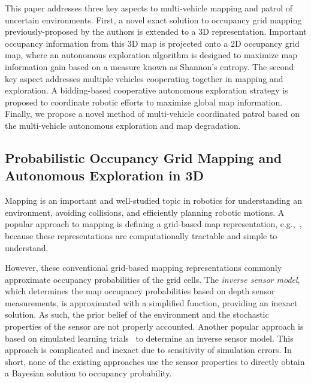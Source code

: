 \documentclass[smallextended]{svjour3}       %
\begin{document}
This paper addresses three key aspects to multi-vehicle mapping and patrol of uncertain environments. First, a novel exact solution to occupancy grid mapping previously-proposed by the authors is extended to a 3D representation. Important occupancy information from this 3D map is projected onto a 2D occupancy grid map, where an autonomous exploration algorithm is designed to maximize map information gain based on a measure known as Shannon's entropy. The second key aspect addresses multiple vehicles cooperating together in mapping and exploration. A bidding-based cooperative autonomous exploration strategy is proposed to coordinate robotic efforts to maximize global map information. Finally, we propose a novel method of multi-vehicle coordinated patrol based on the multi-vehicle autonomous exploration and map degradation.

\subsection{Probabilistic Occupancy Grid Mapping and Autonomous Exploration in 3D}


Mapping is an important and well-studied topic in robotics for understanding an environment, avoiding collisions, and efficiently planning robotic motions.
A popular approach to mapping is defining a grid-based map representation, e.g.,~\cite{WolSuk05,MeyBeiBur12,TanThoWolBus14}, because these representations are computationally tractable and simple to understand.

However, these conventional grid-based mapping representations commonly approximate occupancy probabilities of the grid cells. The \emph{inverse sensor model}, which determines the map occupancy probabilities based on depth sensor measurements, is approximated with a simplified function, providing an inexact solution. As such, the prior belief of the environment and the stochastic properties of the sensor are not properly accounted. Another popular approach is based on simulated learning trials~\cite{Thr01,ThrBurFox05,SouMaiGon12} to determine an inverse sensor model. This approach is complicated and inexact due to sensitivity of simulation errors. In short, none of the existing approaches use the sensor properties to directly obtain a Bayesian solution to occupancy probability.
\end{document}
